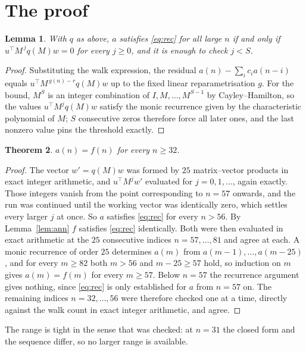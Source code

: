 \documentclass[11pt,a4paper]{article}
\theoremstyle{plain}
\newtheorem{theorem}{Theorem}
\newtheorem{lemma}[theorem]{Lemma}
\theoremstyle{definition}
\begin{document}
\section{The proof}

\begin{lemma}\label{lem:crit}
With $q$ as above, $a$ satisfies \eqref{eq:rec} for all large $n$ if and only if
$u^{\!\top}M^{\,j}q(M)w=0$ for every $j\ge0$, and it is enough to check $j<S$.
\end{lemma}

\begin{proof}
Substituting the walk expression, the residual $a(n)-\sum_ic_ia(n-i)$ equals
$u^{\!\top}M^{\,g(n)-r}q(M)w$ up to the fixed linear reparametrisation $g$. For the bound,
$M^{S}$ is an integer combination of $I,M,\dots,M^{S-1}$ by Cayley--Hamilton, so the values
$u^{\!\top}M^{j}q(M)w$ satisfy the monic recurrence given by the characteristic polynomial of
$M$; $S$ consecutive zeros therefore force all later ones, and the last nonzero value pins the
threshold exactly.
\end{proof}

\begin{theorem}
$a(n)=f(n)$ for every $n\ge32$.
\end{theorem}

\begin{proof}
The vector $w'=q(M)w$ was formed by $25$ matrix--vector products in exact integer
arithmetic, and $u^{\!\top}M^{j}w'$ evaluated for $j=0,1,\dots$, again exactly. Those integers
vanish from the point corresponding to $n=57$ onwards, and the run was continued until the
working vector was identically zero, which settles every larger $j$ at once. So $a$ satisfies
\eqref{eq:rec} for every $n>56$. By Lemma~\ref{lem:ann} $f$ satisfies \eqref{eq:rec}
identically. Both were then evaluated in exact arithmetic at the $25$ consecutive indices
$n=57,\dots,81$ and agree at each. A monic recurrence of order $25$
determines $a(m)$ from $a(m-1),\dots,a(m-25)$, and for every $m\ge82$ both
$m>56$ and $m-25\ge57$ hold, so induction on $m$ gives $a(m)=f(m)$ for every
$m\ge57$.
Below $n=57$ the recurrence argument gives nothing, since \eqref{eq:rec} is only
established for $a$ from $n=57$ on. The remaining indices $n=32,\dots,56$ were
therefore checked one at a time, directly against the walk count in exact integer arithmetic,
and agree.
\end{proof}

The range is tight in the sense that was checked: at $n=31$ the closed form and the sequence differ, so no larger range is available.
\end{document}
